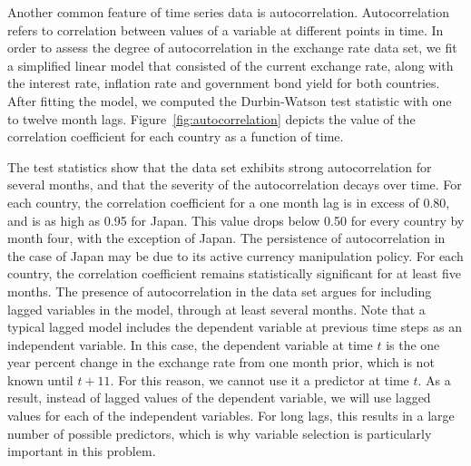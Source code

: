 \documentclass{sig-alternate-05-2015}
\begin{document}
Another common feature of time series data is autocorrelation. Autocorrelation refers to correlation between values of a variable at different points in time. In order to assess the degree of autocorrelation in the exchange rate data set, we fit a simplified linear model that consisted of the current exchange rate, along with the interest rate, inflation rate and government bond yield for both countries. After fitting the model, we computed the Durbin-Watson test statistic with one to twelve month lags. Figure~\ref{fig:autocorrelation} depicts the value of the correlation coefficient for each country as a function of time.
\par{} The test statistics show that the data set exhibits strong autocorrelation for several months, and that the severity of the autocorrelation decays over time. For each country, the correlation coefficient for a one month lag is in excess of 0.80, and is as high as 0.95 for Japan. This value drops below 0.50 for every country by month four, with the exception of Japan. The persistence of autocorrelation in the case of Japan may be due to its active currency manipulation policy. For each country, the correlation coefficient remains statistically significant for at least five months. The presence of autocorrelation in the data set argues for including lagged variables in the model, through at least several months. Note that a typical lagged model includes the dependent variable at previous time steps as an independent variable. In this case, the dependent variable at time $t$ is the one year percent change in the exchange rate from one month prior, which is not known until $t+11$. For this reason, we cannot use it a predictor at time $t$. As a result, instead of lagged values of the dependent variable, we will use lagged values for each of the independent variables. For long lags, this results in a large number of possible predictors, which is why variable selection is particularly important in this problem.

\end{document}
